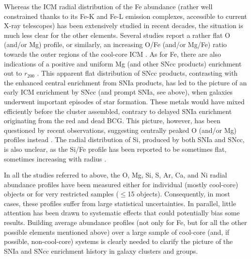 \documentclass{aa}
\begin{document}
Whereas the ICM radial distribution of the Fe abundance (rather well constrained thanks to its Fe-K and Fe-L emission complexes, accessible to current X-ray telescopes) has been extensively studied in recent decades, the situation is much less clear for the other elements. Several studies report a rather flat O (and/or Mg) profile, or similarly, an increasing O/Fe (and/or Mg/Fe) ratio towards the outer regions of the cool-core ICM \citep[e.g.][]{2001A&A...379..107T,2003A&A...401..443M,2004A&A...420..135T,2006A&A...459..353W}. As for Fe, there are also indications of a positive and uniform Mg (and other SNcc products) enrichment out to $r_{200}$ \citep{2015ApJ...811L..25S,2016arXiv160903581E}. This apparent flat distribution of SNcc products, contrasting with the enhanced central enrichment from SNIa products, has led to the picture of an early ICM enrichment by SNcc (and prompt SNIa, see above), when galaxies underwent important episodes of star formation. These metals would have mixed efficiently before the cluster assembled, contrary to delayed SNIa enrichment originating from the red and dead BCG. This picture, however, has been questioned by recent observations, suggesting centrally peaked O (and/or Mg) profiles instead \citep[e.g.][]{2007PASJ...59S.327M,2009PASJ...61S.353S,2009A&A...493..409S,2011A&A...528A..60L,2015A&A...575A..37M}. The radial distribution of Si, produced by both SNIa and SNcc, is also unclear, as the Si/Fe profile has been reported to be sometimes flat, sometimes increasing with radius \citep[e.g.][]{2007MNRAS.380.1554R,2011A&A...528A..60L,2011MNRAS.418.2744M,2014ApJ...781...36S}.

In all the studies referred to above, the O, Mg, Si, S, Ar, Ca, and Ni radial abundance profiles have been measured either for individual (mostly cool-core) objects or for very restricted samples ($\le$15 objects). Consequently, in most cases, these profiles suffer from large statistical uncertainties. In parallel, little attention has been drawn to systematic effects that could potentially bias some results. Building average abundance profiles (not only for Fe, but for all the other possible elements mentioned above) over a large sample of cool-core (and, if possible, non-cool-core) systems is clearly needed to clarify the picture of the SNIa and SNcc enrichment history in galaxy clusters and groups. 
\end{document}
